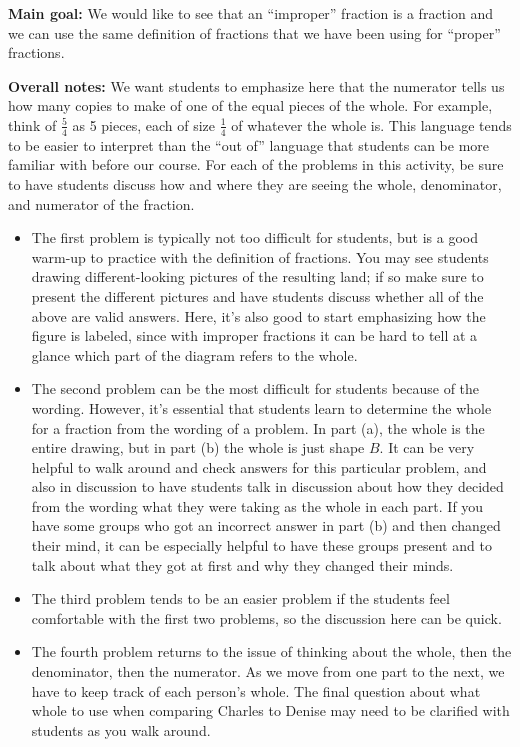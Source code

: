 \documentclass{ximera}
\begin{document}
\newpage

\begin{instructorNotes}

{\bf Main goal:} We would like to see that an ``improper'' fraction is a fraction and we can use the same definition of fractions that we have been using for ``proper'' fractions.

{\bf Overall notes:} We want students to emphasize here that the numerator tells us how many copies to make of one of the equal pieces of the whole. For example, think of $\frac{5}{4}$ as 5 pieces, each of size $\frac{1}{4}$ of whatever the whole is. This language tends to be easier to interpret than the ``out of'' language that students can be more familiar with before our course. For each of the problems in this activity, be sure to have students discuss how and where they are seeing the whole, denominator, and numerator of the fraction.
\begin{itemize}
	\item The first problem is typically not too difficult for students, but is a good warm-up to practice with the definition of fractions. You may see students drawing different-looking pictures of the resulting land; if so make sure to present the different pictures and have students discuss whether all of the above are valid answers. Here, it's also good to start emphasizing how the figure is labeled, since with improper fractions it can be hard to tell at a glance which part of the diagram refers to the whole.
	\item The second problem can be the most difficult for students because of the wording. However, it's essential that students learn to determine the whole for a fraction from the wording of a problem. In part (a), the whole is the entire drawing, but in part (b) the whole is just shape $B$. It can be very helpful to walk around and check answers for this particular problem, and also in discussion to have students talk in discussion about how they decided from the wording what they were taking as the whole in each part. If you have some groups who got an incorrect answer in part (b) and then changed their mind, it can be especially helpful to have these groups present and to talk about what they got at first and why they changed their minds.
	\item The third problem tends to be an easier problem if the students feel comfortable with the first two problems, so the discussion here can be quick.
	\item The fourth problem returns to the issue of thinking about the whole, then the denominator, then the numerator. As we move from one part to the next, we have to keep track of each person's whole. The final question about what whole to use when comparing  Charles  to Denise  may need to be clarified with students as you walk around.
\end{itemize}


\end{instructorNotes}
\end{document}
